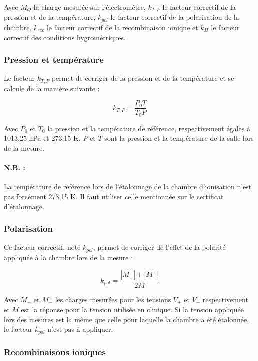 \documentclass{article}
\begin{document}
Avec $M_Q$ la charge mesurée sur l'électromètre, $k_{T,P}$ le facteur correctif de la pression et de la température, $k_{pol}$ le facteur correctif de la polarisation de la chambre, $k_{rec}$ le facteur correctif de la recombinaison ionique et $k_H$ le facteur correctif des conditions hygrométriques.

\subsubsection{Pression et température}

Le facteur $k_{T,P}$ permet de corriger de la pression et de la température et se calcule de la manière suivante :

\begin{equation}
  k_{T,P} = \dfrac{P_0T}{T_0P}
  \label{eq_k_TP}
\end{equation}

Avec $P_0$ et $T_0$ la pression et la température de référence, respectivement égales à 1013,25 hPa et 273,15 K, $P$ et $T$ sont la pression et la température de la salle lors de la mesure.

\paragraph*{N.B. :} La température de référence lors de l'étalonnage de la chambre d'ionisation n'est pas forcément 273,15 K. Il faut utiliser celle mentionnée sur le certificat d'étalonnage.

\subsubsection{Polarisation}

Ce facteur correctif, noté $k_{pol}$, permet de corriger de l'effet de la polarité appliquée à la chambre lors de la mesure :

\begin{equation}
  k_{pol} = \dfrac{|M_+| + |M_-|}{2M}
  \label{eq_pol}
\end{equation}

Avec $M_+$ et $M_-$ les charges mesurées pour les tensions $V_+$ et $V_-$ respectivement et $M$ est la réponse pour la tension utilisée en clinique. Si la tension appliquée lors des mesures est la même que celle pour laquelle la chambre a été étalonnée, le facteur $k_{pol}$ n'est pas à appliquer.

\subsubsection{Recombinaisons ioniques}
\end{document}
